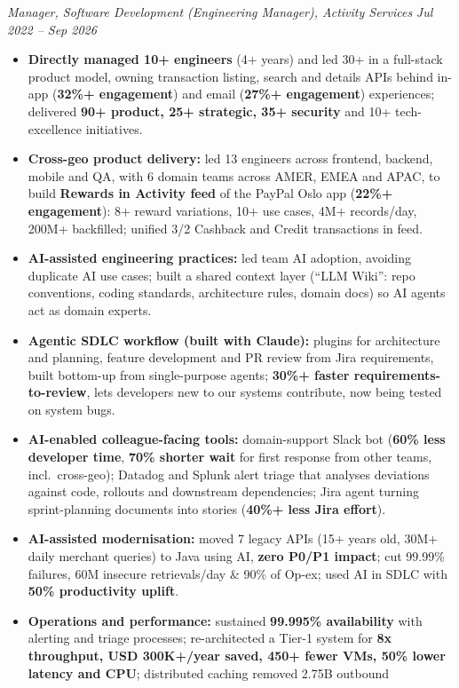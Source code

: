 \documentclass[10pt,a4paper]{article}
\newcommand{\bd}[1]{\textbf{#1}}
\newcommand{\role}[2]{%
  \par\vspace{2pt}\noindent\textcolor{rolecolor}{\textit{#1}}\hfill
  \textcolor{rolecolor}{\textit{#2}}\par\nopagebreak}
\begin{document}
\role{Manager, Software Development (Engineering Manager), Activity Services}{Jul 2022 -- Sep 2026}
\begin{itemize}
\item \bd{Directly managed 10+ engineers} (4+ years) and led 30+ in a full-stack product model,
  owning transaction listing, search and details APIs behind in-app (\bd{32\%+ engagement}) and
  email (\bd{27\%+ engagement}) experiences; delivered \bd{90+ product, 25+ strategic, 35+
  security} and 10+ tech-excellence initiatives.
\item \bd{Cross-geo product delivery:} led 13 engineers across frontend, backend, mobile and QA, with
  6 domain teams across AMER, EMEA and APAC, to build \bd{Rewards in Activity feed} of the
  PayPal Oslo app (\bd{22\%+ engagement}): 8+ reward variations, 10+ use cases, 4M+
  records/day, 200M+ backfilled; unified 3/2 Cashback and Credit transactions in feed.
\item \bd{AI-assisted engineering practices:} led team AI adoption, avoiding duplicate AI use
  cases; built a shared context layer (``LLM Wiki'': repo conventions, coding standards,
  architecture rules, domain docs) so AI agents act as domain experts.
\item \bd{Agentic SDLC workflow (built with Claude):} plugins for architecture and planning,
  feature development and PR review from Jira requirements, built bottom-up from single-purpose
  agents; \bd{30\%+ faster requirements-to-review}, lets developers new to our systems
  contribute, now being tested on system bugs.
\item \bd{AI-enabled colleague-facing tools:} domain-support Slack bot (\bd{60\% less developer time},
  \bd{70\% shorter wait} for first response from other teams, incl.\ cross-geo); Datadog and
  Splunk alert triage that analyses deviations against code, rollouts and downstream
  dependencies; Jira agent turning sprint-planning documents into stories (\bd{40\%+ less Jira
  effort}).
\item \bd{AI-assisted modernisation:} moved 7 legacy APIs (15+ years old, 30M+
  daily merchant queries) to Java using AI, \bd{zero P0/P1 impact}; cut 99.99\% failures,
  60M insecure retrievals/day \& 90\% of Op-ex; used AI in SDLC with \bd{50\% productivity uplift}.
\item \bd{Operations and performance:} sustained \bd{99.995\% availability} with alerting and
  triage processes; re-architected a Tier-1 system for \bd{8x throughput, USD 300K+/year saved,
  450+ fewer VMs, 50\% lower latency and CPU}; distributed caching removed 2.75B outbound

\end{itemize}
\end{document}
